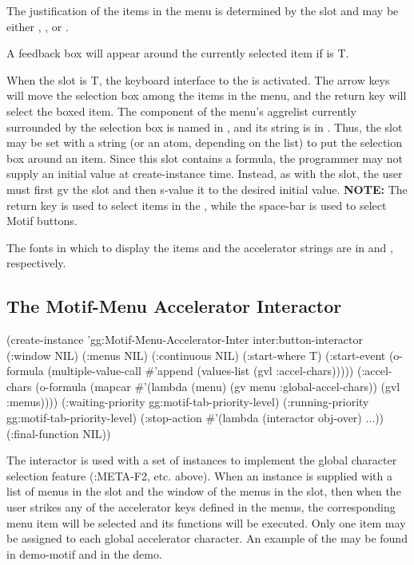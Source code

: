The justification of the items in the menu is determined by the slot
 and may be either , , or .

A feedback box will appear around the currently selected item if
 is T.

When the slot  is T, the keyboard interface to the
 is activated.  The arrow keys will move the selection box among
the items in the menu, and the return key will select the boxed item.
The component of the menu's aggrelist currently surrounded by the selection
box is named in
, and its string is in .
Thus, the slot  may be set with a string (or an atom,
depending on the  list) to put the selection box around an item.
Since this slot contains a formula, the programmer may not supply an initial
value at create-instance time.  Instead, as with the  slot, the user
must first gv the  slot and then s-value it to
the desired initial value.  {\bf NOTE:} The return key is used to select items
in the , while the space-bar is used to select Motif buttons.

The fonts in which to display the items and the accelerator strings are in
 and , respectively.


\subsection{The Motif-Menu Accelerator Interactor}

\begin{programexample}
(create-instance 'gg:Motif-Menu-Accelerator-Inter inter:button-interactor
   (:window NIL)
   (:menus NIL)
   (:continuous NIL)
   (:start-where T)
   (:start-event (o-formula (multiple-value-call \#'append
			      (values-list (gvl :accel-chars)))))
   (:accel-chars (o-formula (mapcar \#'(lambda (menu)
					(gv menu :global-accel-chars))
				    (gvl :menus))))
   (:waiting-priority gg:motif-tab-priority-level)
   (:running-priority gg:motif-tab-priority-level)
   (:stop-action \#'(lambda (interactor obj-over) ...))
   (:final-function NIL))
\end{programexample}

The  interactor is used with a set of
instances to implement the global character selection feature (:META-F2, etc.
above).  When an instance is supplied with a list of menus in the 
slot and the window of the menus in the  slot, then when the
user strikes any of the accelerator keys defined in the menus, the
corresponding menu item will be selected and its functions will be executed.
Only one item may be assigned to each global accelerator character.
An example of the  may be found in demo-motif
and in the  demo.


